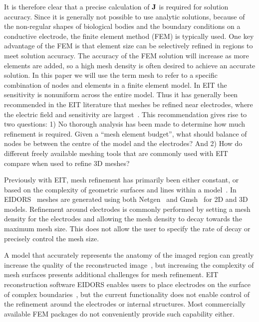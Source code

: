 It is therefore clear that a precise  calculation of $\bf J$ is
required for solution accuracy. Since it is generally not
possible to use analytic solutions, because of the non-regular
shapes of biological bodies and the boundary conditions on a
conductive electrode, the finite element method (FEM) is typically
used. 
One key advantage of the FEM is that element size can be
selectively refined in regions to meet solution accuracy. 
The accuracy of the FEM solution will increase as more elements are
added, so a high mesh density is often desired to achieve an 
accurate solution. 
In this paper we will use the term mesh to refer to a specific 
combination of nodes and elements in a finite element model. 
In EIT the sensitivity is nonuniform 
across the entire model.
Thus
it has generally been recommended in the EIT literature 
that meshes be refined near electrodes, where the electric 
field and sensitivity are largest~\parencite{adler_electrical_2017}. 
This recommendation gives rise to two questions: 
1) No thorough analysis has been made to determine how much 
refinement is required. Given a ``mesh element budget'', what should
balance of nodes be between the centre of the model and the electrodes? And 
2) How do different freely available meshing tools that are
commonly used with EIT compare when used to refine 3D meshes?

Previously with EIT, mesh refinement has primarily been either 
constant, or based on 
the complexity of geometric surfaces and lines within a model~\parencite{grychtol_fem_2013}.  
In EIDORS~\parencite{adler_uses_2006} meshes are generated using both 
Netgen~\parencite{schoberl_netgen_1997} and Gmsh~\parencite{geuzaine_gmsh_2009} 
for 2D and 3D models. 
Refinement around electrodes is commonly performed by 
setting a mesh density for the electrodes and allowing the mesh density to 
decay towards the maximum mesh size. This does not allow the user to specify 
the rate of decay or precisely control the mesh size.   

A model that accurately represents the anatomy of the imaged region 
can greatly increase the quality of the reconstructed image~\parencite{grychtol_impact_2012},
but increasing the complexity of mesh surfaces presents additional challenges for
mesh refinement.  EIT reconstruction software EIDORS enables users to place electrodes on the surface of complex 
boundaries~\parencite{grychtol_fem_2013}, but the current functionality does not  
enable control of the refinement around the electrodes or internal 
structures.
Most commercially available FEM packages
do not conveniently provide such capability either.


